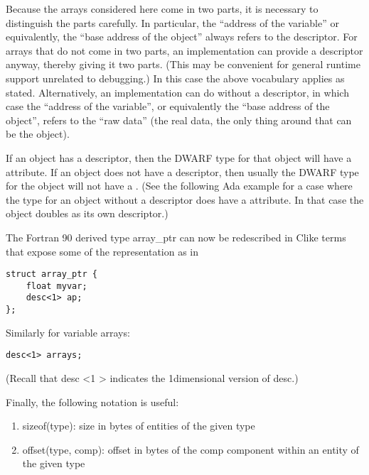 Because the arrays considered here come in two parts, it is
necessary to distinguish the parts carefully. In particular,
the “address of the variable” or equivalently, the “base
address of the object” always refers to the descriptor. For
arrays that do not come in two parts, an implementation can
provide a descriptor anyway, thereby giving it two parts. (This
may be convenient for general runtime support unrelated to
debugging.) In this case the above vocabulary applies as
stated. Alternatively, an implementation can do without a
descriptor, in which case the “address of the variable”,
or equivalently the “base address of the object”, refers
to the “raw data” (the real data, the only thing around
that can be the object).

If an object has a descriptor, then the DWARF type for that
object will have a  attribute. If an object
does not have a descriptor, then usually the DWARF type for the
object will not have a . (See the following
Ada example for a case where the type for an object without
a descriptor does have a  attribute. In
that case the object doubles as its own descriptor.)

The Fortran 90 derived type array\_ptr can now be redescribed
in C\dash like terms that expose some of the representation as in

\begin{lstlisting}
struct array_ptr {
    float myvar;
    desc<1> ap;
};
\end{lstlisting}

Similarly for variable arrays:
\begin{lstlisting}
desc<1> arrays;
\end{lstlisting}

(Recall that desc \textless 1 \textgreater 
indicates the 1\dash dimensional version of desc.)

Finally, the following notation is useful:

\begin{enumerate}[1.]
\item  sizeof(type): size in bytes of entities of the given type

\item offset(type, comp): offset in bytes of the comp component
within an entity of the given type
\end{enumerate}



